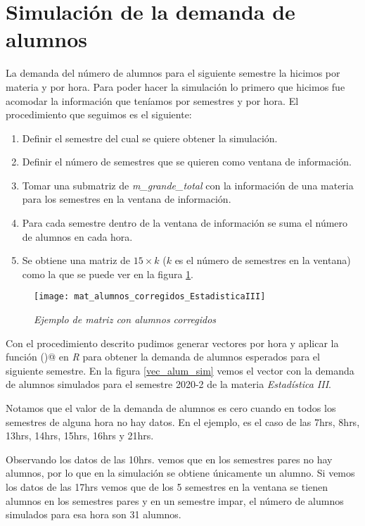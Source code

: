 \section{Simulación de la demanda de alumnos} \label{SimDemandaAlumnos}

La demanda del número de alumnos para el siguiente semestre la hicimos por materia y por hora. Para poder hacer la simulación lo primero que hicimos fue acomodar la información que teníamos por semestres y por hora. El procedimiento que seguimos es el siguiente:

\begin{enumerate}
\item Definir el semestre del cual se quiere obtener la simulación.

\item Definir el número de semestres que se quieren como ventana de información.

\item Tomar una submatriz de \textit{m\_grande\_total} con la información de una materia para los semestres en la ventana de información.

\item Para cada semestre dentro de la ventana de información se suma el número de alumnos en cada hora.

\item Se obtiene una matriz de $15 \times k$ ($k$ es el número de semestres en la ventana) como la que se puede ver en la figura \ref{matAl_corregidos}.
\end{enumerate}

\begin{figure}[H]
\centering
\texttt{[image: mat\_alumnos\_corregidos\_EstadisticaIII]} %
\caption{\textit{Ejemplo de matriz con alumnos corregidos}}\label{matAl_corregidos}
\end{figure}

Con el procedimiento descrito pudimos generar vectores por hora y aplicar la función \verb@hw()@ en \textit{R} para obtener la demanda de alumnos esperados para el siguiente semestre. En la figura \ref{vec_alum_sim} vemos el vector con la demanda de alumnos simulados para el semestre 2020-2 de la materia \textit{Estadística III}.

Notamos que el valor de la demanda de alumnos es cero cuando en todos los semestres de alguna hora no hay datos. En el ejemplo, es el caso de las 7hrs, 8hrs, 13hrs, 14hrs, 15hrs, 16hrs y 21hrs.

Observando los datos de las 10hrs. vemos que en los semestres pares no hay alumnos, por lo que en la simulación se obtiene únicamente un alumno. Si vemos los datos de las 17hrs vemos que de los 5 semestres en la ventana se tienen alumnos en los semestres pares y en un semestre impar, el número de alumnos simulados para esa hora son 31 alumnos.

